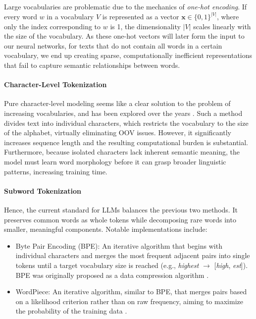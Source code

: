 Large vocabularies are problematic due to the mechanics of \emph{one-hot encoding}.
If every word $w$ in a vocabulary $V$ is represented as a vector $\mathbf{x} \in \{0, 1\}^{|V|}$, where only the index corresponding to $w$ is 1, the dimensionality $|V|$ scales linearly with the size of the vocabulary. As these one-hot vectors will later form the input to our neural networks, for texts that do not contain all words in a certain vocabulary, we end up creating sparse, computationally inefficient representations that fail to capture semantic relationships between words.

\paragraph{Character-Level Tokenization} 
Pure character-level modeling seems like a clear solution to the problem of increasing vocabularies, and has been explored over the years \citep{mielke2021wordscharactersbriefhistory}. Such a method divides text into individual characters, which restricts the vocabulary to the size of the alphabet, virtually eliminating OOV issues. However, it significantly increases sequence length and the resulting computational burden is substantial. Furthermore, because isolated characters lack inherent semantic meaning, the model must learn word morphology before it can grasp broader linguistic patterns, increasing training time.

\paragraph{Subword Tokenization} Hence, the current standard for LLMs balances the previous two methods. It preserves common words as whole tokens while decomposing rare words into smaller, meaningful components. Notable implementations include:

\begin{itemize}
    \item Byte Pair Encoding (BPE): An iterative algorithm that begins with individual characters and merges the most frequent adjacent pairs into single tokens until a target vocabulary size is reached \citep{sennrich-etal-2016-neural} (e.g., \textit{highest} $\rightarrow$ [\textit{high}, \textit{est}]). BPE was originally proposed as a data compression algorithm \citep{gage1994new}.
    \item WordPiece: An iterative algorithm, similar to BPE, that merges pairs based on a likelihood criterion rather than on raw frequency, aiming to maximize the probability of the training data \citep{wu2016googlesneuralmachinetranslation}.
\end{itemize}


